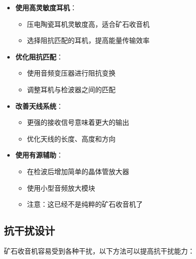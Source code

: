 \documentclass[12pt,UTF8]{ctexbook}
\begin{document}
\begin{itemize}[leftmargin=3.5em]
    \item \textbf{使用高灵敏度耳机}：
        \begin{itemize}[leftmargin=3.5em]
            \item 压电陶瓷耳机灵敏度高，适合矿石收音机
            \item 选择阻抗匹配的耳机，提高能量传输效率
        \end{itemize}
    \item \textbf{优化阻抗匹配}：
        \begin{itemize}[leftmargin=3.5em]
            \item 使用音频变压器进行阻抗变换
            \item 调整耳机与检波器之间的匹配
        \end{itemize}
    \item \textbf{改善天线系统}：
        \begin{itemize}[leftmargin=3.5em]
            \item 更强的接收信号意味着更大的输出
            \item 优化天线的长度、高度和方向
        \end{itemize}
    \item \textbf{使用有源辅助}：
        \begin{itemize}[leftmargin=3.5em]
            \item 在检波后增加简单的晶体管放大器
            \item 使用小型音频放大模块
            \item 注意：这已经不是纯粹的矿石收音机了
        \end{itemize}
\end{itemize}

\subsection{抗干扰设计}

矿石收音机容易受到各种干扰，以下方法可以提高抗干扰能力：
\end{document}
